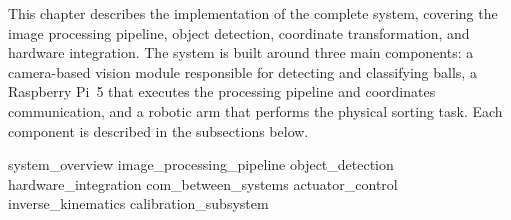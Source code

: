 \label{cha:implementation}

This chapter describes the implementation of the complete system, covering the image
processing pipeline, object detection, coordinate transformation, and hardware
integration. The system is built around three main components: a camera-based vision
module responsible for detecting and classifying balls, a Raspberry Pi~5 that
executes the processing pipeline and coordinates communication, and a robotic arm
that performs the physical sorting task. Each component is described in the
subsections below.

{system_overview}
{image_processing_pipeline}
{object_detection}
{hardware_integration}
{com_between_systems}
{actuator_control}
{inverse_kinematics}
{calibration_subsystem}
